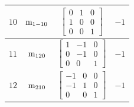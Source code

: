\documentclass[fleqn,8pt]{jsarticle}
\begin{document}
\begin{longtable}{cccc}
$ 10 $ & $ {\rm m}_{1-10} $ & $ \begin{bmatrix} 0 & 1 & 0 \\ 1 & 0 & 0 \\ 0 & 0 & 1 \end{bmatrix} $ & $ -1 $ \\ \hline
$ 11 $ & $ {\rm m}_{120} $ & $ \begin{bmatrix} 1 & -1 & 0 \\ 0 & -1 & 0 \\ 0 & 0 & 1 \end{bmatrix} $ & $ -1 $ \\ \hline
$ 12 $ & $ {\rm m}_{210} $ & $ \begin{bmatrix} -1 & 0 & 0 \\ -1 & 1 & 0 \\ 0 & 0 & 1 \end{bmatrix} $ & $ -1 $ \\
\end{longtable}
\end{document}

